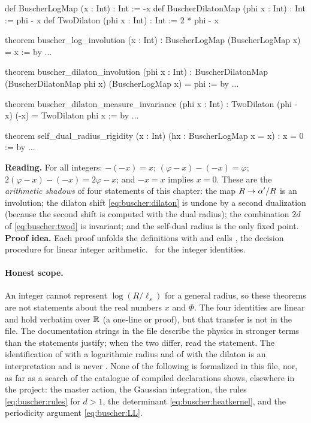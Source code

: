 \begin{leanbox}
\begin{leancode}
def BuscherLogMap (x : Int) : Int := -x
def BuscherDilatonMap (phi x : Int) : Int := phi - x
def TwoDilaton (phi x : Int) : Int := 2 * phi - x

theorem buscher_log_involution (x : Int) :
    BuscherLogMap (BuscherLogMap x) = x := by ...

theorem buscher_dilaton_involution (phi x : Int) :
    BuscherDilatonMap (BuscherDilatonMap phi x) (BuscherLogMap x) = phi :=
  by ...

theorem buscher_dilaton_measure_invariance (phi x : Int) :
    TwoDilaton (phi - x) (-x) = TwoDilaton phi x := by ...

theorem self_dual_radius_rigidity (x : Int) (hx : BuscherLogMap x = x) :
    x = 0 := by ...
\end{leancode}
\textbf{Reading.} For all integers: $-(-x)=x$; $(\varphi-x)-(-x)=\varphi$;
$2(\varphi-x)-(-x)=2\varphi-x$; and $-x=x$ implies $x=0$. These are the \emph{arithmetic
shadows} of four statements of this chapter: the map $R\to\alpha'/R$ is an involution; the dilaton
shift \eqref{eq:buscher:dilaton} is undone by a second dualization (because the second shift is
computed with the dual radius); the combination $2d$ of \eqref{eq:buscher:twod} is invariant;
and the self-dual radius is the only fixed point.
\textbf{Proof idea.} Each proof unfolds the definitions with  and calls
, the decision procedure for linear integer arithmetic. \TA\ for the integer
identities.
\end{leanbox}

\paragraph{Honest scope.} An integer cannot represent $\log(R/\ell_s)$ for a general radius,
so these theorems are not statements about the real numbers $x$ and $\Phi$. The four
identities are linear and hold verbatim over $\mathbb{R}$ (a one-line  or 
proof), but that transfer is not in the file. The documentation strings in the file describe
the physics in stronger terms than the statements justify; when the two differ, read the
statement. The identification of  with a logarithmic radius and of  with
the dilaton is an interpretation and is never \TA. None of the following is formalized in
this file, nor, as far as a search of the catalogue of compiled declarations shows, elsewhere
in the project: the master action, the Gaussian integration, the rules
\eqref{eq:buscher:rules} for $d>1$, the determinant \eqref{eq:buscher:heatkernel}, and the
periodicity argument \eqref{eq:buscher:LL}.

